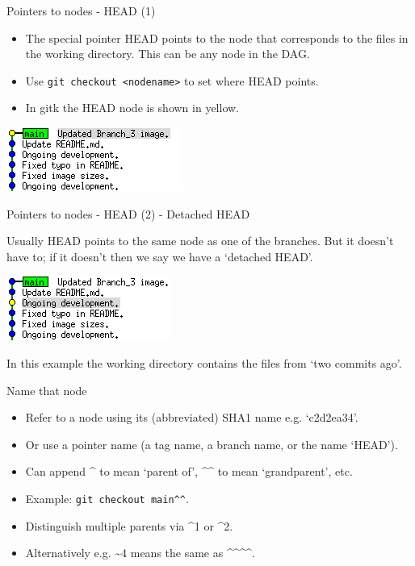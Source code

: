 \documentclass[usenames,dvipsnames]{beamer}
\newcommand{\code}[1]{\colorbox{light-gray}{\texttt{#1}}}
\begin{document}
\begin{frame}{Pointers to nodes - HEAD (1)}
  \begin{block}{}
    \begin{itemize}
      \item{The special pointer HEAD points to the node that corresponds to the files in the working directory. This can be any node in the DAG.}
      \item{ Use \code{git checkout <nodename>} to set where HEAD points.}
      \item{In gitk the HEAD node is shown in yellow.}
    \end{itemize}
    \begin{center}
      \includegraphics[scale=0.8]{Head.png}
    \end{center}
  \end{block}
\end{frame}

\begin{frame}{Pointers to nodes - HEAD (2) - Detached HEAD}
  \begin{block}{}
     Usually HEAD points to the same node as one of the branches. But it doesn't have to; if it doesn't then we say we have a `detached HEAD'.
    \begin{center}
      \includegraphics[scale=0.8]{DetachedHead.png}
    \end{center}
    In this example the working directory contains the files from `two commits ago'.
  \end{block}
\end{frame}

\begin{frame}{Name that node}
  \begin{block}{}
    \begin{itemize}
      \item{Refer to a node using its (abbreviated) SHA1 name e.g. `c2d2ea34'.}
      \item{Or use a pointer name (a tag name, a branch name, or the name `HEAD').}
      \item{Can append \^{} to mean `parent of', \^{}\^{} to mean `grandparent', etc.}
      \item{Example: \code{git checkout main\^{}\^{}}.}
      \item{Distinguish multiple parents via \^{}1 or \^{}2.}
      \item{Alternatively e.g. \textasciitilde4 means the same as \^{}\^{}\^{}\^{}.}
    \end{itemize}
  \end{block}
\end{frame}
\end{document}
